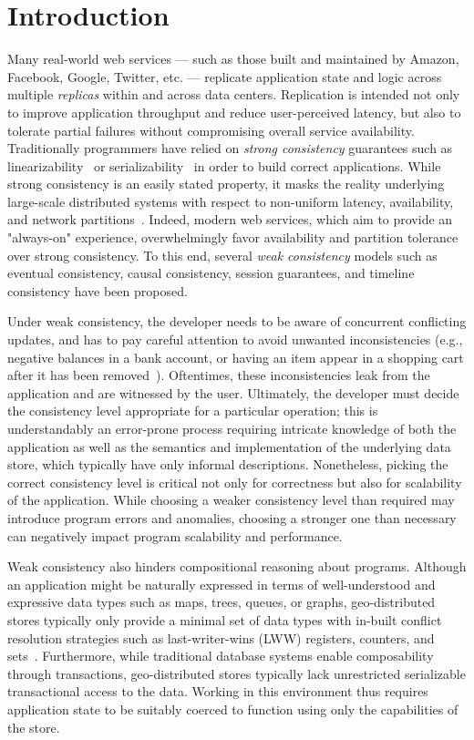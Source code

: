 \section{Introduction}

Many real-world web services --- such as those built and maintained by Amazon,
Facebook, Google, Twitter, etc. --- replicate application state and logic
across multiple \emph{replicas} within and across data centers. Replication is
intended not only to improve application throughput and reduce user-perceived
latency, but also to tolerate partial failures without compromising overall
service availability. Traditionally programmers have relied on \emph{strong
consistency} guarantees such as linearizability~\cite{Herlihy1990} or
serializability~\cite{Serializability} in order to build correct applications.
While strong consistency is an easily stated property, it masks the reality
underlying large-scale distributed systems with respect to non-uniform latency,
availability, and network partitions~\cite{Brewer2000,Gilbert2002}. Indeed,
modern web services, which aim to provide an "always-on" experience,
overwhelmingly favor availability and partition tolerance over strong
consistency. To this end, several \emph{weak consistency} models such as
eventual consistency, causal consistency, session guarantees, and timeline
consistency have been proposed.

Under weak consistency, the developer needs to be aware of concurrent
conflicting updates, and has to pay careful attention to avoid unwanted
inconsistencies (e.g., negative balances in a bank account, or having an item
appear in a shopping cart after it has been removed~\cite{Dynamo}). Oftentimes,
these inconsistencies leak from the application and are witnessed by the user.
Ultimately, the developer must decide the consistency level appropriate for a
particular operation; this is understandably an error-prone process requiring
intricate knowledge of both the application as well as the semantics and
implementation of the underlying data store, which typically have only informal
descriptions. Nonetheless, picking the correct consistency level is critical
not only for correctness but also for scalability of the application. While
choosing a weaker consistency level than required may introduce program errors
and anomalies, choosing a stronger one than necessary can negatively impact
program scalability and performance.

Weak consistency also hinders compositional reasoning about programs.  Although an
application might be naturally expressed in terms of well-understood and
expressive data types such as maps, trees, queues, or graphs, geo-distributed
stores typically only provide a minimal set of data types with in-built
conflict resolution strategies such as last-writer-wins (LWW) registers,
counters, and sets~\cite{Cassandra,DynamoDB}.  Furthermore, while traditional
database systems enable composability through transactions, geo-distributed
stores typically lack unrestricted serializable transactional access to the
data. Working in this environment thus requires application state to be
suitably coerced to function using only the capabilities of the store.

